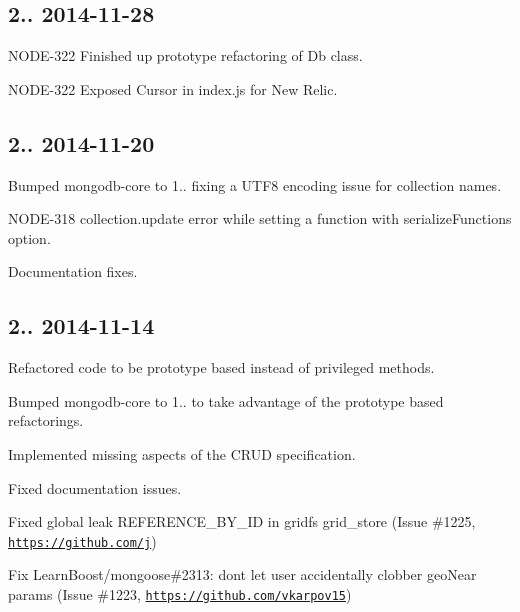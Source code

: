 \subsection*{2.. 2014-\/11-\/28 }


\begin{DoxyItemize}
\item N\+O\+D\+E-\/322 Finished up prototype refactoring of Db class.
\item N\+O\+D\+E-\/322 Exposed Cursor in index.\+js for New Relic.
\end{DoxyItemize}

\subsection*{2.. 2014-\/11-\/20 }


\begin{DoxyItemize}
\item Bumped mongodb-\/core to 1.. fixing a U\+T\+F8 encoding issue for collection names.
\item N\+O\+D\+E-\/318 collection.\+update error while setting a function with serialize\+Functions option.
\item Documentation fixes.
\end{DoxyItemize}

\subsection*{2.. 2014-\/11-\/14 }


\begin{DoxyItemize}
\item Refactored code to be prototype based instead of privileged methods.
\item Bumped mongodb-\/core to 1.. to take advantage of the prototype based refactorings.
\item Implemented missing aspects of the C\+R\+UD specification.
\item Fixed documentation issues.
\item Fixed global leak R\+E\+F\+E\+R\+E\+N\+C\+E\+\_\+\+B\+Y\+\_\+\+ID in gridfs grid\+\_\+store (Issue \#1225, \href{https://github.com/j}{\tt https\+://github.\+com/j})
\item Fix Learn\+Boost/mongoose\#2313\+: don\textquotesingle{}t let user accidentally clobber geo\+Near params (Issue \#1223, \href{https://github.com/vkarpov15}{\tt https\+://github.\+com/vkarpov15})
\end{DoxyItemize}

